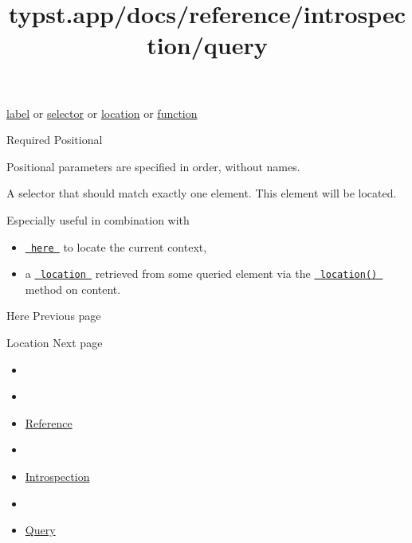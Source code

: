 \href{/docs/reference/foundations/label/}{label} {or}
\href{/docs/reference/foundations/selector/}{selector} {or}
\href{/docs/reference/introspection/location/}{location} {or}
\href{/docs/reference/foundations/function/}{function}

{Required} {{ Positional }}

\label{parameters-selector-positional-tooltip}
Positional parameters are specified in order, without names.

A selector that should match exactly one element. This element will be
located.

Especially useful in combination with

\begin{itemize}
\tightlist
\item
  \href{/docs/reference/introspection/here/}{\texttt{\ here\ }} to
  locate the current context,
\item
  a
  \href{/docs/reference/introspection/location/}{\texttt{\ location\ }}
  retrieved from some queried element via the
  \href{/docs/reference/foundations/content/\#definitions-location}{\texttt{\ location()\ }}
  method on content.
\end{itemize}

\href{/docs/reference/introspection/here/}{\pandocbounded{}}

{ Here } { Previous page }

\href{/docs/reference/introspection/location/}{\pandocbounded{}}

{ Location } { Next page }


\title{typst.app/docs/reference/introspection/query}

\begin{itemize}
\tightlist
\item
  \href{/docs}{}
\item
  
\item
  \href{/docs/reference/}{Reference}
\item
  
\item
  \href{/docs/reference/introspection/}{Introspection}
\item
  
\item
  \href{/docs/reference/introspection/query/}{Query}
\end{itemize}

